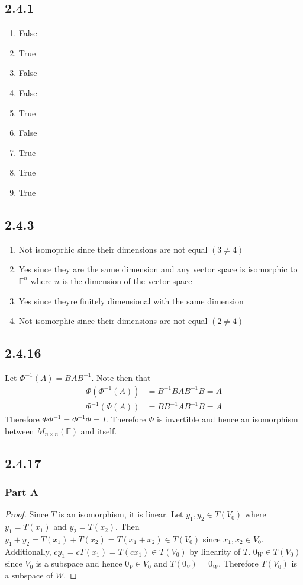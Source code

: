 \documentclass[12pt,titlepage]{extarticle}
\begin{document}
\subsection*{2.4.1}
\begin{enumerate}[label=\alph*)]
    \item False
    \item True
    \item False
    \item False
    \item True
    \item False
    \item True
    \item True
    \item True
\end{enumerate}

\subsection*{2.4.3}
\begin{enumerate}[label=\alph*)]
    \item Not isomoprhic since their dimensions are not equal $(3 \neq 4)$   
    \item Yes since they are the same dimension and any vector space is isomorphic to $\mathbb{F}^n$ where $n$ is the dimension of the vector space
    \item Yes since theyre finitely dimensional with the same dimension
    \item Not isomorphic since their dimensions are not equal $(2 \neq 4)$
\end{enumerate}

\subsection*{2.4.16}
Let $\Phi^{-1}(A) = B A B^{-1}$. Note then that
\begin{align*}
    \Phi(\Phi^{-1} (A)) &= B^{-1} B A B^{-1} B = A \\
    \Phi^{-1}(\Phi(A)) &= B B^{-1} A B^{-1} B = A
\end{align*}
Therefore $\Phi \Phi^{-1} = \Phi^{-1} \Phi = I$. Therefore $\Phi$ is invertible and hence an isomorphism between $M_{n\times n} (\mathbb{F})$ and itself.

\subsection*{2.4.17}
\subsubsection*{Part A}
\begin{proof}
    Since $T$ is an isomorphism, it is linear. Let $y_1, y_2 \in T(V_0)$ where $y_1 = T(x_1)$ and $y_2 = T(x_2)$. Then $y_1 + y_2 = T(x_1) + T(x_2) = T(x_1 + x_2) \in T(V_0)$ since $x_1, x_2 \in V_0$. Additionally, $c y_1 = c T(x_1) = T(cx_1) \in T(V_0)$ by linearity of $T$. $0_W \in T(V_0)$ since $V_0$ is a subspace and hence $0_V \in V_0$ and $T(0_V) = 0_W$. Therefore $T(V_0)$ is a subspace of $W$.
\end{proof}
\end{document}
